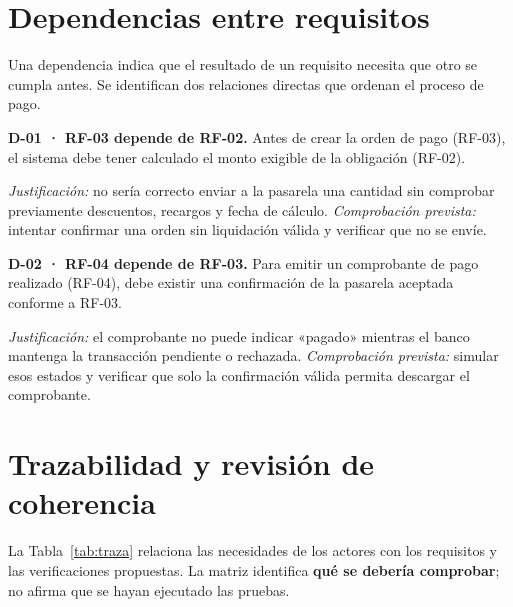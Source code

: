 \documentclass[10pt,onecolumn]{IEEEtran}
\newcommand{\rf}[2]{\par\smallskip\noindent\textbf{#1.} #2\par}
\begin{document}
\section{Dependencias entre requisitos}
Una dependencia indica que el resultado de un requisito necesita que otro se cumpla antes. Se identifican dos relaciones directas que ordenan el proceso de pago.

\rf{D-01 · RF-03 depende de RF-02}{Antes de crear la orden de pago (RF-03), el sistema debe tener calculado el monto exigible de la obligación (RF-02).}
\noindent\textit{Justificación:} no sería correcto enviar a la pasarela una cantidad sin comprobar previamente descuentos, recargos y fecha de cálculo. \textit{Comprobación prevista:} intentar confirmar una orden sin liquidación válida y verificar que no se envíe.\par

\rf{D-02 · RF-04 depende de RF-03}{Para emitir un comprobante de pago realizado (RF-04), debe existir una confirmación de la pasarela aceptada conforme a RF-03.}
\noindent\textit{Justificación:} el comprobante no puede indicar «pagado» mientras el banco mantenga la transacción pendiente o rechazada. \textit{Comprobación prevista:} simular esos estados y verificar que solo la confirmación válida permita descargar el comprobante.\par

\section{Trazabilidad y revisión de coherencia}
La Tabla~\ref{tab:traza} relaciona las necesidades de los actores con los requisitos y las verificaciones propuestas. La matriz identifica \textbf{qué se debería comprobar}; no afirma que se hayan ejecutado las pruebas.
\end{document}

